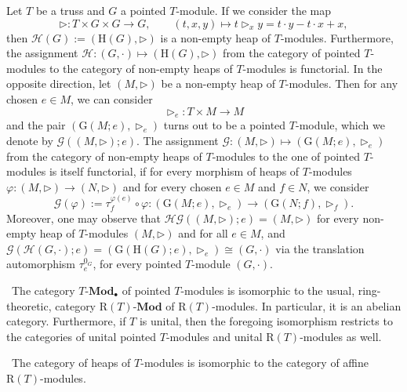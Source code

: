\documentclass[11pt, twoside]{article}
\begin{document}
\begin{remark}{\rm \cite[Remark 2.16]{mb}}
Let $T$ be a truss and $G$ a pointed $T$-module. If we consider the map
\[\triangleright : T \times G \times G \longrightarrow G, \qquad (t,x,y) \longmapsto t \triangleright_x y = t \cdot y - t \cdot x + x,\]
then $\mathcal{H}(G) := (\mathrm{H}(G),\triangleright)$ is a non-empty heap of $T$-modules. Furthermore, the assignment $\mathcal{H} : (G,\cdot) \longmapsto (\mathrm{H}(G),\triangleright)$ from the category of pointed $T$-modules to the category of non-empty heaps of $T$-modules is functorial.
In the opposite direction, let $(M,\triangleright)$ be a non-empty heap of $T$-modules. Then for any chosen $e \in M$, we can consider
\[\triangleright_e : T \times M \to M\]
and the pair $(\mathrm{G}(M;e),\triangleright_e)$ turns out to be a pointed $T$-module, which we denote by $\mathcal{G}((M,\triangleright);e)$. The assignment $\mathcal{G} : (M,\triangleright) \longmapsto (\mathrm{G}(M;e),\triangleright_e)$ from the category of non-empty heaps of $T$-modules to the one of pointed $T$-modules is itself functorial, if for every morphism of heaps of $T$-modules $\varphi : (M,\triangleright) \to (N,\triangleright)$ and for every chosen $e \in M$ and $f \in N$, we consider
\[\mathcal{G}(\varphi) := \tau_{f}^{\varphi(e)} \circ \varphi : (\mathrm{G}(M;e),\triangleright_e) \longrightarrow (\mathrm{G}(N;f),\triangleright_f).\]
Moreover, one may observe that $\mathcal{H}\mathcal{G}((M,\triangleright);e) = (M,\triangleright)$ for every non-empty heap of $T$-modules $(M,\triangleright)$ and for all $e \in M$, and $\mathcal{G}(\mathcal{H}(G,\cdot);e) = (\mathrm{G}(\mathrm{H}(G);e),\triangleright_e) \cong (G,\cdot)$ via the translation automorphism $\tau_e^{0_G}$, for every pointed $T$-module $(G,\cdot)$.
\end{remark}

\begin{theorem}{\rm \cite[Theorem 3.1]{mb}}\rm
~The category $T\textbf{-Mod}_{\bullet}$ of pointed $T$-modules is isomorphic to the usual, ring-theoretic, category $\mathrm{R}(T)\textbf{-Mod}$ of $\mathrm{R}(T)$-modules. In particular, it is an abelian category. Furthermore, if $T$ is unital, then the foregoing isomorphism restricts to the categories of unital pointed $T$-modules and unital $\mathrm{R}(T)$-modules as well.
\end{theorem}

\begin{theorem}{\rm \cite[Theorem 3.8]{mb}}\rm
~The category of heaps of $T$-modules is isomorphic to the category of affine $\mathrm{R}(T)$-modules.
\end{theorem}
\end{document}
